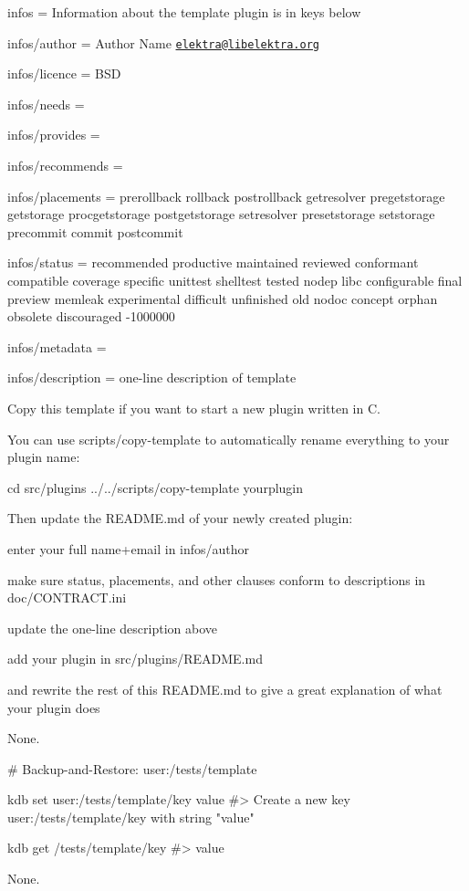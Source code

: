 
\begin{DoxyItemize}
\item infos = Information about the template plugin is in keys below
\item infos/author = Author Name \href{mailto:elektra@libelektra.org}{\tt elektra@libelektra.\+org}
\item infos/licence = B\+SD
\item infos/needs =
\item infos/provides =
\item infos/recommends =
\item infos/placements = prerollback rollback postrollback getresolver pregetstorage getstorage procgetstorage postgetstorage setresolver presetstorage setstorage precommit commit postcommit
\item infos/status = recommended productive maintained reviewed conformant compatible coverage specific unittest shelltest tested nodep libc configurable final preview memleak experimental difficult unfinished old nodoc concept orphan obsolete discouraged -\/1000000
\item infos/metadata =
\item infos/description = one-\/line description of template
\end{DoxyItemize}

Copy this template if you want to start a new plugin written in C.

You can use {\ttfamily scripts/copy-\/template} to automatically rename everything to your plugin name\+:


\begin{DoxyCode}
cd src/plugins
../../scripts/copy-template yourplugin
\end{DoxyCode}


Then update the R\+E\+A\+D\+M\+E.\+md of your newly created plugin\+:


\begin{DoxyItemize}
\item enter your full name+email in {\ttfamily infos/author}
\item make sure {\ttfamily status}, {\ttfamily placements}, and other clauses conform to descriptions in {\ttfamily doc/\+C\+O\+N\+T\+R\+A\+C\+T.\+ini}
\item update the one-\/line description above
\item add your plugin in {\ttfamily src/plugins/\+R\+E\+A\+D\+M\+E.\+md}
\item and rewrite the rest of this {\ttfamily R\+E\+A\+D\+M\+E.\+md} to give a great explanation of what your plugin does
\end{DoxyItemize}

None.


\begin{DoxyCode}
# Backup-and-Restore: user:/tests/template

kdb set user:/tests/template/key value
#> Create a new key user:/tests/template/key with string "value"

kdb get /tests/template/key
#> value
\end{DoxyCode}


None. 